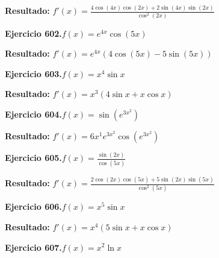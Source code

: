 \documentclass[10pt,a4paper]{article}
\begin{document}
\begin{solbox}
\textbf{Resultado:} \(\displaystyle f'(x) = \frac{4\cos(4x)\cos(2x) + 2\sin(4x)\sin(2x)}{\cos^2(2x)}\)
\end{solbox}

\begin{ejbox}
\textbf{Ejercicio 602.}\quad $f(x) = e^{4x} \cos(5x)$
\end{ejbox}

\begin{solbox}
\textbf{Resultado:} \(\displaystyle f'(x) = e^{4x}(4\cos(5x) - 5\sin(5x))\)
\end{solbox}

\begin{ejbox}
\textbf{Ejercicio 603.}\quad $f(x) = x^{4} \sin x$
\end{ejbox}

\begin{solbox}
\textbf{Resultado:} \(\displaystyle f'(x) = x^{3}(4\sin x + x\cos x)\)
\end{solbox}

\newpage
\begin{ejbox}
\textbf{Ejercicio 604.}\quad $f(x) = \sin(e^{3x^{2}})$
\end{ejbox}

\begin{solbox}
\textbf{Resultado:} \(\displaystyle f'(x) = 6x^{1}e^{3x^{2}}\cos(e^{3x^{2}})\)
\end{solbox}

\begin{ejbox}
\textbf{Ejercicio 605.}\quad $f(x) = \frac{\sin(2x)}{\cos(5x)}$
\end{ejbox}

\begin{solbox}
\textbf{Resultado:} \(\displaystyle f'(x) = \frac{2\cos(2x)\cos(5x) + 5\sin(2x)\sin(5x)}{\cos^2(5x)}\)
\end{solbox}

\begin{ejbox}
\textbf{Ejercicio 606.}\quad $f(x) = x^{5} \sin x$
\end{ejbox}

\begin{solbox}
\textbf{Resultado:} \(\displaystyle f'(x) = x^{4}(5\sin x + x\cos x)\)
\end{solbox}

\newpage
\begin{ejbox}
\textbf{Ejercicio 607.}\quad $f(x) = x^{2} \ln x$
\end{ejbox}
\end{document}
